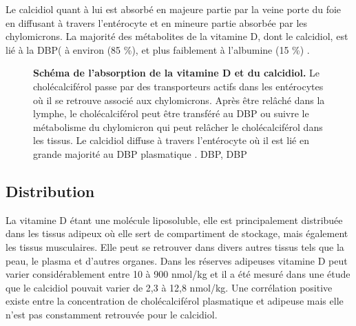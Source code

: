 \documentclass[
  a4paper,
  DIV=11,
  numbers=noendperiod,
  listof=totoc]{scrreprt}
\begin{document}
Le calcidiol quant à lui est absorbé en majeure partie par la veine
porte du foie en diffusant à travers l'entérocyte et en mineure partie
absorbée par les chylomicrons. La majorité des métabolites de la
vitamine D, dont le calcidiol, est lié à la \ac{DBP}( à environ (85 \%),
et plus faiblement à l'albumine (15 \%) \autocite{Bikle.2017}.

\begin{figure}


\caption[Schéma de l'absorption de la vitamine D et du
calcidiol.]{\label{fig-vd-absorption}\textbf{Schéma de l'absorption de
la vitamine D et du calcidiol.} Le cholécalciférol passe par des
transporteurs actifs dans les entérocytes où il se retrouve associé aux
chylomicrons. Après être relâché dans la lymphe, le cholécalciférol peut
être transféré au \ac{DBP} ou suivre le métabolisme du chylomicron qui
peut relâcher le cholécalciférol dans les tissus. Le calcidiol diffuse à
travers l'entérocyte où il est lié en grande majorité au \ac{DBP}
plasmatique \autocite{Schoenmakers.2018}. \acs{DBP}, \acl{DBP}}

\end{figure}%

\subsection{Distribution}\label{distribution}

La vitamine D étant une molécule liposoluble, elle est principalement
distribuée dans les tissus adipeux où elle sert de compartiment de
stockage, mais également les tissus musculaires. Elle peut se retrouver
dans divers autres tissus tels que la peau, le plasma et d'autres
organes. Dans les réserves adipeuses vitamine D peut varier
considérablement entre 10 à 900 nmol/kg et il a été mesuré dans une
étude que le calcidiol pouvait varier de 2,3 à 12,8 nmol/kg. Une
corrélation positive existe entre la concentration de cholécalciférol
plasmatique et adipeuse mais elle n'est pas constamment retrouvée pour
le calcidiol.
\end{document}
